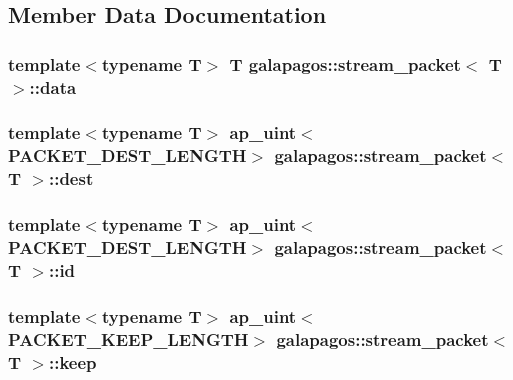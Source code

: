 \subsection{Member Data Documentation}
\subsubsection[{\texorpdfstring{data}{data}}]{\setlength{\rightskip}{0pt plus 5cm}template$<$typename T$>$ {\bf T} {\bf galapagos\+::stream\+\_\+packet}$<$ {\bf T} $>$\+::data}\hypertarget{structgalapagos_1_1stream__packet_ab7df62196ecabd5c8a84b626653ce053}{}\label{structgalapagos_1_1stream__packet_ab7df62196ecabd5c8a84b626653ce053}
\subsubsection[{\texorpdfstring{dest}{dest}}]{\setlength{\rightskip}{0pt plus 5cm}template$<$typename T$>$ ap\+\_\+uint$<${\bf P\+A\+C\+K\+E\+T\+\_\+\+D\+E\+S\+T\+\_\+\+L\+E\+N\+G\+TH}$>$ {\bf galapagos\+::stream\+\_\+packet}$<$ {\bf T} $>$\+::dest}\hypertarget{structgalapagos_1_1stream__packet_a02e87b0b9321904135595e35e3df5c3e}{}\label{structgalapagos_1_1stream__packet_a02e87b0b9321904135595e35e3df5c3e}
\subsubsection[{\texorpdfstring{id}{id}}]{\setlength{\rightskip}{0pt plus 5cm}template$<$typename T$>$ ap\+\_\+uint$<${\bf P\+A\+C\+K\+E\+T\+\_\+\+D\+E\+S\+T\+\_\+\+L\+E\+N\+G\+TH}$>$ {\bf galapagos\+::stream\+\_\+packet}$<$ {\bf T} $>$\+::id}\hypertarget{structgalapagos_1_1stream__packet_a0a24dc38c3b6df8b686af2873d6c997d}{}\label{structgalapagos_1_1stream__packet_a0a24dc38c3b6df8b686af2873d6c997d}
\subsubsection[{\texorpdfstring{keep}{keep}}]{\setlength{\rightskip}{0pt plus 5cm}template$<$typename T$>$ ap\+\_\+uint$<${\bf P\+A\+C\+K\+E\+T\+\_\+\+K\+E\+E\+P\+\_\+\+L\+E\+N\+G\+TH}$>$ {\bf galapagos\+::stream\+\_\+packet}$<$ {\bf T} $>$\+::keep}\hypertarget{structgalapagos_1_1stream__packet_af69cb752aebbfc03ef33c571a08e1b55}{}\label{structgalapagos_1_1stream__packet_af69cb752aebbfc03ef33c571a08e1b55}
